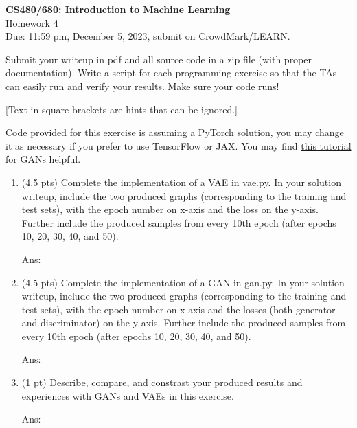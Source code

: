 \documentclass[10pt,letter,notitlepage]{article}
\newcommand{\ans}[1]{{\color{orange}\textsf{Ans}: #1}}
\newcounter{exercise}
\begin{document}
\begin{center}
\large{\textbf{CS480/680: Introduction to Machine Learning} \\ Homework 4\\ Due: 11:59 pm, December 5, 2023, submit on CrowdMark/LEARN.} \\


\end{center}

\begin{center}
Submit your writeup in pdf and all source code in a zip file (with proper documentation). Write a script for each programming exercise so that the TAs can easily run and verify your results. Make sure your code runs!

[Text in square brackets are hints that can be ignored.]
\end{center}


\begin{exercise}
  Code provided for this exercise is assuming a PyTorch solution, you may change it as necessary if you prefer to use TensorFlow or JAX.
  You may find \href{https://pytorch.org/tutorials/beginner/dcgan_faces_tutorial.html}{this tutorial} for GANs helpful. 
  \begin{enumerate}[label=\alph*]
    \item (4.5 pts) Complete the implementation of a VAE in vae.py. 
      In your solution writeup, include the two produced graphs (corresponding to the training and test sets), with the epoch number on x-axis and the loss on the y-axis.
      Further include the produced samples from every 10th epoch (after epochs 10, 20, 30, 40, and 50).

      \ans{} 
    \item (4.5 pts) Complete the implementation of a GAN in gan.py. 
      In your solution writeup, include the two produced graphs (corresponding to the training and test sets), with the epoch number on x-axis and the losses (both generator and discriminator) on the y-axis.
      Further include the produced samples from every 10th epoch (after epochs 10, 20, 30, 40, and 50).


      \ans{} 
    \item (1 pt) Describe, compare, and constrast your produced results and experiences with GANs and VAEs in this exercise.

      \ans{} 
  \end{enumerate}

\end{exercise}
\end{document}
